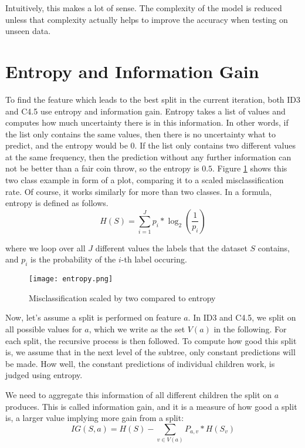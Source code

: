 \documentclass[a4paper]{article}
\begin{document}
Intuitively, this makes a lot of sense. The complexity of the model is reduced unless that complexity actually helps to improve the accuracy when testing on unseen data.

\section{Entropy and Information Gain}
\label{sec:entropy}

To find the feature which leads to the best split in the current iteration, both ID3 and C4.5 use entropy and information gain. Entropy takes a list of values and computes how much uncertainty there is in this information. In other words, if the list only contains the same values, then there is no uncertainty what to predict, and the entropy would be $0$. If the list only contains two different values at the same frequency, then the prediction without any further information can not be better than a fair coin throw, so the entropy is $0.5$.  Figure \ref{fig:entropy} shows this two class example in form of a plot, comparing it to a scaled misclassification rate. Of course, it works similarly for more than two classes. In a formula, entropy is defined as follows.
\[
	H(S) = \sum\limits_{i = 1}^J p_i * \log_2\left(\frac{1}{p_i}\right)
\]

\noindent where we loop over all $J$ different values the labels that the dataset $S$ contains, and $p_i$ is the probability of the $i$-th label occuring.

\begin{figure}[h]
	\texttt{[image: entropy.png]}
    \caption{Misclassification scaled by two compared to entropy}
    \label{fig:entropy}
\end{figure}

Now, let's assume a split is performed on feature $a$. In ID3 and C4.5, we split on all possible values for $a$, which we write as the set $V(a)$ in the following. For each split, the recursive process is then followed. To compute how good this split is, we assume that in the next level of the subtree, only constant predictions will be made. How well, the constant predictions of individual children work, is judged using entropy.

We need to aggregate this information of all different children the split on $a$ produces. This is called information gain, and it is a measure of how good a split is, a larger value implying more gain from a split:
\[
	\mathit{IG}(S, a) = H(S) - \sum\limits_{v \in V(a)} P_{a, v} * H(S_v)
\]
\end{document}
